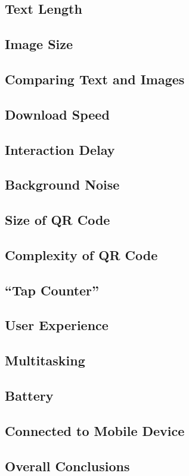 \subsection{Text Length}

\subsection{Image Size}

\subsection{Comparing Text and Images}

\subsection{Download Speed}

\subsection{Interaction Delay}

\subsection{Background Noise}

\subsection{Size of QR Code}

\subsection{Complexity of QR Code}

\subsection{``Tap Counter''}

\subsection{User Experience}

\subsection{Multitasking}

\subsection{Battery}

\subsection{Connected to Mobile Device}

\subsection{Overall Conclusions}